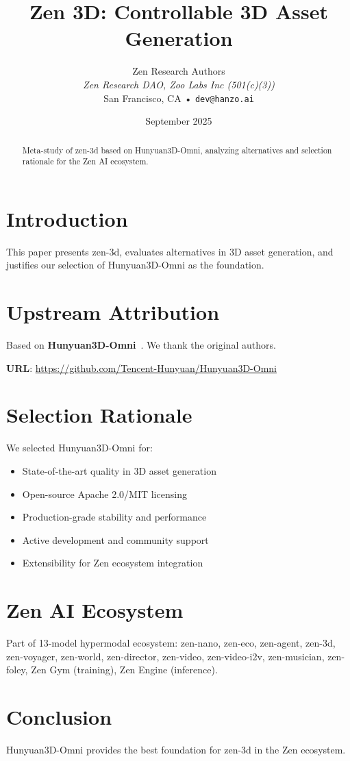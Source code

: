 \documentclass[11pt,a4paper]{article}
\title{Zen 3D: Controllable 3D Asset Generation}
\author{
    Zen Research Authors \\
    \textit{Zen Research DAO, Zoo Labs Inc (501(c)(3))} \\
    San Francisco, CA • \texttt{dev@hanzo.ai}
}
\date{September 2025}
\begin{document}
\maketitle

\begin{abstract}
Meta-study of zen-3d based on Hunyuan3D-Omni, analyzing alternatives and selection rationale for the Zen AI ecosystem.
\end{abstract}

\section{Introduction}
This paper presents zen-3d, evaluates alternatives in 3D asset generation, and justifies our selection of Hunyuan3D-Omni as the foundation.

\section{Upstream Attribution}
Based on \textbf{Hunyuan3D-Omni}~\cite{upstream2025}. We thank the original authors.

\textbf{URL}: \url{https://github.com/Tencent-Hunyuan/Hunyuan3D-Omni}

\section{Selection Rationale}
We selected Hunyuan3D-Omni for:
\begin{itemize}
    \item State-of-the-art quality in 3D asset generation
    \item Open-source Apache 2.0/MIT licensing
    \item Production-grade stability and performance
    \item Active development and community support
    \item Extensibility for Zen ecosystem integration
\end{itemize}

\section{Zen AI Ecosystem}
Part of 13-model hypermodal ecosystem: zen-nano, zen-eco, zen-agent, zen-3d, zen-voyager, zen-world, zen-director, zen-video, zen-video-i2v, zen-musician, zen-foley, Zen Gym (training), Zen Engine (inference).

\section{Conclusion}
Hunyuan3D-Omni provides the best foundation for zen-3d in the Zen ecosystem.



\end{document}
